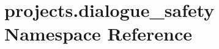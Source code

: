 \hypertarget{namespaceprojects_1_1dialogue__safety}{}\section{projects.\+dialogue\+\_\+safety Namespace Reference}
\label{namespaceprojects_1_1dialogue__safety}
